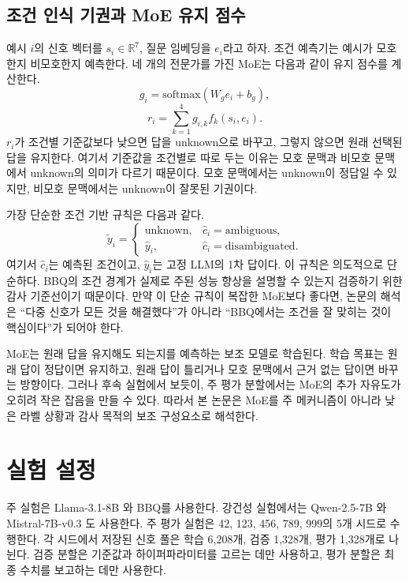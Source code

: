 \documentclass{ieeeaccess}
\begin{document}
\subsection{조건 인식 기권과 MoE 유지 점수}
예시 $i$의 신호 벡터를 $s_i\in\mathbb{R}^7$, 질문 임베딩을 $e_i$라고 하자. 조건 예측기는 예시가 모호한지 비모호한지 예측한다. 네 개의 전문가를 가진 MoE는 다음과 같이 유지 점수를 계산한다.
\begin{equation}
    g_i=\mathrm{softmax}(W_g e_i+b_g),
\end{equation}
\begin{equation}
    r_i=\sum_{k=1}^{4}g_{i,k} f_k(s_i,e_i).
\end{equation}
$r_i$가 조건별 기준값보다 낮으면 답을 unknown으로 바꾸고, 그렇지 않으면 원래 선택된 답을 유지한다. 여기서 기준값을 조건별로 따로 두는 이유는 모호 문맥과 비모호 문맥에서 unknown의 의미가 다르기 때문이다. 모호 문맥에서는 unknown이 정답일 수 있지만, 비모호 문맥에서는 unknown이 잘못된 기권이다.

가장 단순한 조건 기반 규칙은 다음과 같다.
\begin{equation}
    \tilde{y}_i =
    \begin{cases}
    \mathrm{unknown}, & \hat{c}_i=\mathrm{ambiguous},\\
    \hat{y}_i, & \hat{c}_i=\mathrm{disambiguated}.
    \end{cases}
\end{equation}
여기서 $\hat{c}_i$는 예측된 조건이고, $\hat{y}_i$는 고정 LLM의 1차 답이다. 이 규칙은 의도적으로 단순하다. BBQ의 조건 경계가 실제로 주된 성능 향상을 설명할 수 있는지 검증하기 위한 감사 기준선이기 때문이다. 만약 이 단순 규칙이 복잡한 MoE보다 좋다면, 논문의 해석은 ``다중 신호가 모든 것을 해결했다''가 아니라 ``BBQ에서는 조건을 잘 맞히는 것이 핵심이다''가 되어야 한다.

MoE는 원래 답을 유지해도 되는지를 예측하는 보조 모델로 학습된다. 학습 목표는 원래 답이 정답이면 유지하고, 원래 답이 틀리거나 모호 문맥에서 근거 없는 답이면 바꾸는 방향이다. 그러나 후속 실험에서 보듯이, 주 평가 분할에서는 MoE의 추가 자유도가 오히려 작은 잡음을 만들 수 있다. 따라서 본 논문은 MoE를 주 메커니즘이 아니라 낮은 라벨 상황과 감사 목적의 보조 구성요소로 해석한다.

\section{실험 설정}
\label{sec:setup}

주 실험은 Llama-3.1-8B \cite{meta2024llama31}와 BBQ를 사용한다. 강건성 실험에서는 Qwen-2.5-7B \cite{yang2024qwen25}와 Mistral-7B-v0.3 \cite{jiang2023mistral}도 사용한다. 주 평가 실험은 42, 123, 456, 789, 999의 5개 시드로 수행한다. 각 시드에서 저장된 신호 풀은 학습 6,208개, 검증 1,328개, 평가 1,328개로 나뉜다. 검증 분할은 기준값과 하이퍼파라미터를 고르는 데만 사용하고, 평가 분할은 최종 수치를 보고하는 데만 사용한다.
\end{document}
